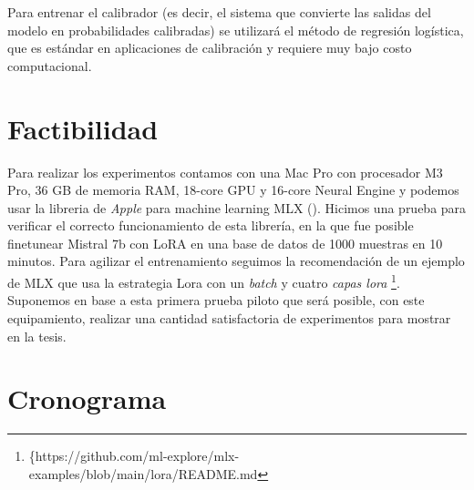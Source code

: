 \documentclass[a4paper,11pt,titlepage]{article}
\begin{document}
Para entrenar el calibrador (es decir, el sistema que convierte las salidas del modelo en probabilidades calibradas) se utilizará el método de regresión logística, que es estándar en aplicaciones de calibración y requiere muy bajo costo computacional. 

\section{Factibilidad}\label{sec3}
Para realizar los experimentos contamos con una Mac Pro con procesador M3 Pro, 36 GB de memoria RAM, 18-core GPU y 16-core Neural Engine y podemos usar la libreria de \textit{Apple} para machine learning MLX (\cite{mlx2023}). Hicimos una prueba para verificar el correcto funcionamiento de esta librería, en la que fue posible finetunear Mistral 7b con LoRA en una base de datos de 1000 muestras en 10 minutos. Para agilizar el entrenamiento seguimos la recomendación de un ejemplo de MLX que usa la estrategia Lora con un \textit{batch} y cuatro \textit{capas lora} \footnote{\{https://github.com/ml-explore/mlx-examples/blob/main/lora/README.md}. Suponemos en base a esta primera prueba piloto que será posible, con este equipamiento, realizar una cantidad satisfactoria de experimentos para mostrar en la tesis.

\section{Cronograma}



 \small
 
\end{document}
